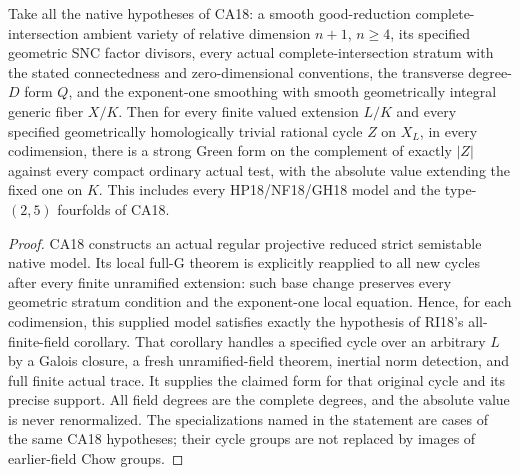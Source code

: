 \begin{corollary}
\label{r18ru:local}
Take all the native hypotheses of CA18: a smooth good-reduction
complete-intersection ambient variety of relative dimension $n+1$,
$n\ge4$, its specified geometric SNC factor divisors, every actual
complete-intersection stratum with the stated connectedness and
zero-dimensional conventions, the transverse degree-$D$ form $Q$,
and the exponent-one smoothing with smooth geometrically integral
generic fiber $X/K$.  Then for every finite valued extension $L/K$
and every specified geometrically homologically trivial rational
cycle $Z$ on $X_L$, in every codimension, there is a strong Green
form on the complement of exactly $|Z|$ against every compact
ordinary actual test, with the absolute value extending the fixed
one on $K$.
This includes every HP18/NF18/GH18 model and the type-$(2,5)$
fourfolds of CA18.
\end{corollary}

\begin{proof}
CA18 constructs an actual regular projective reduced strict
semistable native model.  Its local full-G theorem is explicitly
reapplied to all new cycles after every finite unramified extension:
such base change preserves every geometric stratum condition and
the exponent-one local equation.  Hence, for each codimension,
this supplied model satisfies exactly the hypothesis of
RI18's all-finite-field corollary.
That corollary handles a specified cycle over an arbitrary $L$
by a Galois closure, a fresh unramified-field theorem, inertial
norm detection, and full finite actual trace.  It supplies the
claimed form for that original cycle and its precise support.
All field degrees are the complete degrees, and the absolute value
is never renormalized.  The specializations named in the statement
are cases of the same CA18 hypotheses; their cycle groups are not
replaced by images of earlier-field Chow groups.
\end{proof}

